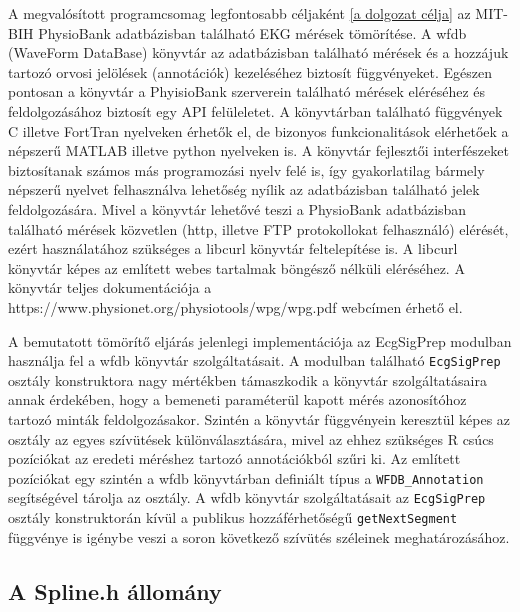 \documentclass[oneside,titlepage,12pt,a4paper]{report}
\begin{document}
A megvalósított programcsomag legfontosabb céljaként \ref{a dolgozat célja} az MIT-BIH PhysioBank adatbázisban található EKG mérések tömörítése. A wfdb (WaveForm DataBase) könyvtár az adatbázisban található mérések és a hozzájuk tartozó orvosi jelölések (annotációk) kezeléséhez biztosít függvényeket. Egészen pontosan a könyvtár a PhyisioBank szerverein található mérések eléréséhez és feldolgozásához biztosít egy API felüleletet. A könyvtárban található függvények C illetve FortTran nyelveken érhetők el, de bizonyos funkcionalitások elérhetőek a népszerű MATLAB illetve python nyelveken is. A könyvtár fejlesztői interfészeket biztosítanak számos más programozási nyelv felé is, így gyakorlatilag bármely népszerű nyelvet felhasználva lehetőség nyílik az adatbázisban található jelek feldolgozására. Mivel a könyvtár lehetővé teszi a PhysioBank adatbázisban található mérések közvetlen (http, illetve FTP protokollokat felhasználó) elérését, ezért használatához szükséges a libcurl könyvtár feltelepítése is. A libcurl könyvtár képes az említett webes tartalmak böngésző nélküli eléréséhez. A könyvtár teljes dokumentációja a https://www.physionet.org/physiotools/wpg/wpg.pdf webcímen érhető el. 
\par A bemutatott tömörítő eljárás jelenlegi implementációja az EcgSigPrep modulban használja fel a wfdb könyvtár szolgáltatásait. A modulban található \texttt{EcgSigPrep} osztály konstruktora nagy mértékben támaszkodik a könyvtár szolgáltatásaira annak érdekében, hogy a bemeneti paraméterül kapott mérés azonosítóhoz tartozó minták feldolgozásakor. Szintén a könyvtár függvényein keresztül képes az osztály az egyes szívütések különválasztására, mivel az ehhez szükséges R csúcs pozíciókat az eredeti méréshez tartozó annotációkból szűri ki. Az említett pozíciókat egy szintén a wfdb könyvtárban definiált típus a \texttt{WFDB\_Annotation} segítségével tárolja az osztály. A wfdb könyvtár szolgáltatásait az \texttt{EcgSigPrep} osztály konstruktorán kívül a publikus hozzáférhetőségű \texttt{getNextSegment} függvénye is igénybe veszi a soron következő szívütés széleinek meghatározásához. 

\subsection*{A Spline.h állomány}
\end{document}
